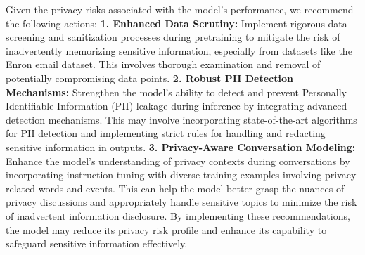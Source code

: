 Given the privacy risks associated with the model's performance, 
we recommend the following actions:
\textbf{1. Enhanced Data Scrutiny:} Implement rigorous data screening and sanitization processes during pretraining to mitigate the risk of inadvertently memorizing sensitive information, especially from datasets like the Enron email dataset. This involves thorough examination and removal of potentially compromising data points. 
\textbf{2. Robust PII Detection Mechanisms:} Strengthen the model's ability to detect and prevent Personally Identifiable Information (PII) leakage during inference by integrating advanced detection mechanisms. This may involve incorporating state-of-the-art algorithms for PII detection and implementing strict rules for handling and redacting sensitive information in outputs.
\textbf{3. Privacy-Aware Conversation Modeling:} Enhance the model's understanding of privacy contexts during conversations by incorporating instruction tuning with diverse training examples involving privacy-related words and events. This can help the model better grasp the nuances of privacy discussions and appropriately handle sensitive topics to minimize the risk of inadvertent information disclosure.
By implementing these recommendations, the model may reduce its privacy risk profile and enhance its capability to safeguard sensitive information effectively.